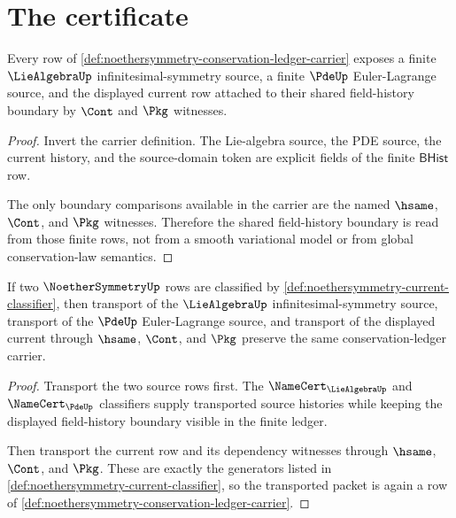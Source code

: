 \section{The certificate}
\label{sec:noethersymmetry-certificate}

\begin{theorem}
\label{thm:noethersymmetry-lie-pde-source-boundary}
Every row of
\autoref{def:noethersymmetry-conservation-ledger-carrier} exposes a finite
$\LieAlgebraUp$ infinitesimal-symmetry source, a finite $\PdeUp$
Euler-Lagrange source, and the displayed current row attached to their shared
field-history boundary by $\Cont$ and $\Pkg$ witnesses.
\end{theorem}
\begin{proof}
Invert the carrier definition. The Lie-algebra source, the PDE source, the
current history, and the source-domain token are explicit fields of the
finite $\mathsf{BHist}$ row.

The only boundary comparisons available in the carrier are the named
$\hsame$, $\Cont$, and $\Pkg$ witnesses. Therefore the shared field-history
boundary is read from those finite rows, not from a smooth variational model
or from global conservation-law semantics.
\end{proof}

\begin{theorem}
\label{thm:noethersymmetry-conservation-ledger-stability}
If two $\NoetherSymmetryUp$ rows are classified by
\autoref{def:noethersymmetry-current-classifier}, then transport of the
$\LieAlgebraUp$ infinitesimal-symmetry source, transport of the $\PdeUp$
Euler-Lagrange source, and transport of the displayed current through
$\hsame$, $\Cont$, and $\Pkg$ preserve the same conservation-ledger carrier.
\end{theorem}
\begin{proof}
Transport the two source rows first. The $\NameCert_{\LieAlgebraUp}$ and
$\NameCert_{\PdeUp}$ classifiers supply transported source histories while
keeping the displayed field-history boundary visible in the finite ledger.

Then transport the current row and its dependency witnesses through
$\hsame$, $\Cont$, and $\Pkg$. These are exactly the generators listed in
\autoref{def:noethersymmetry-current-classifier}, so the transported packet is
again a row of
\autoref{def:noethersymmetry-conservation-ledger-carrier}.
\end{proof}

